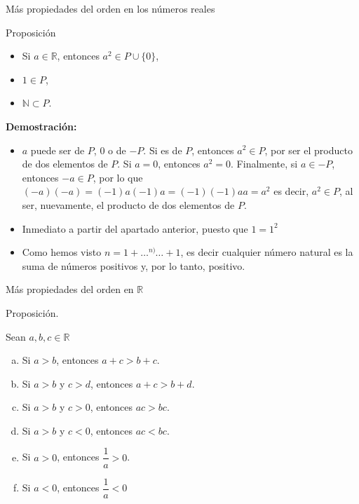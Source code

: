 \documentclass[ignorenonframetext,]{beamer}
\providecommand{\tightlist}{%
  \setlength{\itemsep}{0pt}\setlength{\parskip}{0pt}}
\begin{document}
\begin{frame}{Más propiedades del orden en los números reales}
\protect\hypertarget{muxe1s-propiedades-del-orden-en-los-nuxfameros-reales}{}

Proposición

\begin{itemize}
\tightlist
\item
  Si \(a \in \mathbb{R}\), entonces \(a^2 \in P \cup \{0\}\),
\item
  \(1 \in P\),
\item
  \(\mathbb{N} \subset P\).
\end{itemize}

\textbf{Demostración:}

\begin{itemize}
\item
  \(a\) puede ser de \(P\), \(0\) o de \(-P\). Si es de \(P\), entonces
  \(a^2 \in P\), por ser el producto de dos elementos de \(P\). Si
  \(a=0\), entonces \(a^2 = 0\). Finalmente, si \(a \in -P\), entonces
  \(-a \in P\), por lo que \((-a)(-a) = (-1)a(-1)a=(-1)(-1)aa = a^2\) es
  decir, \(a^2 \in P\), al ser, nuevamente, el producto de dos elementos
  de \(P\).
\item
  Inmediato a partir del apartado anterior, puesto que \(1=1^2\)
\item
  Como hemos visto \(n = 1+ \ldots \overset{n)}{} \ldots + 1\), es decir
  cualquier número natural es la suma de números positivos y, por lo
  tanto, positivo.
\end{itemize}

\end{frame}

\begin{frame}{Más propiedades del orden en \(\mathbb{R}\)}
\protect\hypertarget{muxe1s-propiedades-del-orden-en-mathbbr}{}

Proposición.

Sean \(a,b, c \in \mathbb{R}\)

\begin{enumerate}
[a)]
\tightlist
\item
  Si \(a>b\), entonces \(a+c > b+c\).
\item
  Si \(a>b\) y \(c>d\), entonces \(a+c >b+d\).
\item
  Si \(a>b\) y \(c>0\), entonces \(ac>bc\).
\item
  Si \(a>b\) y \(c<0\), entonces \(ac<bc\).
\item
  Si \(a>0\), entonces \(\dfrac{1}{a} >0\).
\item
  Si \(a<0\), entonces \(\dfrac{1}{a} <0\)
\end{enumerate}

\end{frame}
\end{document}
